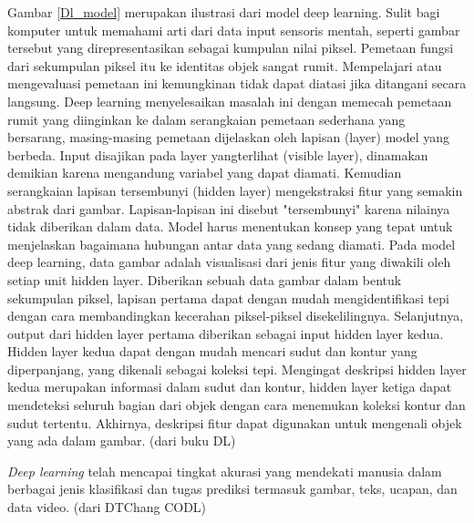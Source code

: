 \documentclass[../thesis.tex]{subfiles}
\begin{document}
Gambar \ref{Dl_model} merupakan ilustrasi dari model deep learning. Sulit bagi komputer untuk memahami arti dari data input sensoris mentah, seperti gambar tersebut yang direpresentasikan
sebagai kumpulan nilai piksel. Pemetaan fungsi dari sekumpulan piksel itu ke identitas objek sangat rumit. Mempelajari atau mengevaluasi pemetaan ini kemungkinan tidak dapat diatasi jika
ditangani secara langsung. Deep learning menyelesaikan masalah ini dengan memecah pemetaan rumit yang diinginkan ke dalam serangkaian pemetaan sederhana yang bersarang, masing-masing
pemetaan dijelaskan oleh lapisan (layer) model yang berbeda. Input disajikan pada layer yangterlihat (visible layer), dinamakan demikian karena mengandung variabel yang dapat diamati.
Kemudian serangkaian lapisan tersembunyi (hidden layer) mengekstraksi fitur yang semakin abstrak dari gambar. Lapisan-lapisan ini disebut "tersembunyi" karena nilainya tidak diberikan
dalam data. Model harus menentukan konsep yang tepat untuk menjelaskan bagaimana hubungan antar data yang sedang diamati. Pada model deep learning, data gambar adalah visualisasi dari 
jenis fitur yang diwakili oleh setiap unit hidden layer. Diberikan sebuah data gambar dalam bentuk sekumpulan piksel, lapisan pertama dapat dengan mudah mengidentifikasi tepi dengan cara
membandingkan kecerahan piksel-piksel disekelilingnya. Selanjutnya, output dari hidden layer pertama diberikan sebagai input hidden layer kedua. Hidden layer kedua dapat dengan mudah
mencari sudut dan kontur yang diperpanjang, yang dikenali sebagai koleksi tepi. Mengingat deskripsi hidden layer kedua merupakan informasi dalam sudut dan kontur, hidden layer ketiga
dapat mendeteksi seluruh bagian dari objek dengan cara menemukan koleksi kontur dan sudut tertentu. Akhirnya, deskripsi fitur dapat digunakan untuk mengenali objek yang ada dalam gambar.
(dari buku DL)

\textit{Deep learning} telah mencapai tingkat akurasi yang mendekati manusia dalam berbagai jenis klasifikasi dan tugas prediksi termasuk
gambar, teks, ucapan, dan data video. (dari DTChang CODL)
\end{document}
